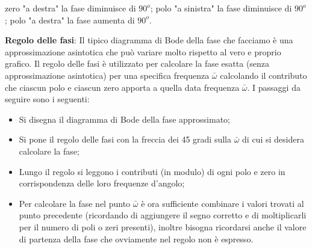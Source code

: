 \begin{landscape}
\begin{enumerate}
        zero "a destra" la fase diminuisce di $90^o$;\newline
        polo "a sinistra" la fase diminuisce di $90^o$;\newline
        polo "a destra" la fase aumenta di $90^o$.
    \end{enumerate}
    \textbf{Regolo delle fasi}:\newline
    Il tipico diagramma di Bode della fase che facciamo è una approssimazione asintotica che può variare molto rispetto al vero e proprio grafico. Il regolo delle fasi è utilizzato per calcolare la fase esatta (senza approssimazione asintotica) per una specifica frequenza $\bar{\omega}$ calcolando il contributo che ciascun polo e ciascun zero apporta a quella data frequenza $\bar{\omega}$.\newline
    I passaggi da seguire sono i seguenti:
    \begin{itemize}
        \item Si disegna il diagramma di Bode della fase approssimato;
        \item Si pone il regolo delle fasi con la freccia dei 45 gradi sulla $\bar{\omega}$ di cui si desidera calcolare la fase;
        \item Lungo il regolo si leggono i contributi (in modulo) di ogni polo e zero in corrispondenza delle loro frequenze d'angolo;
        \item Per calcolare la fase nel punto $\bar{\omega}$ è ora sufficiente combinare i valori trovati al punto precedente (ricordando di aggiungere il segno corretto e  di moltiplicarli per il numero di poli o zeri presenti), inoltre bisogna ricordarsi anche il valore di partenza della fase che ovviamente nel regolo non è espresso.
    \end{itemize}

\end{landscape}
